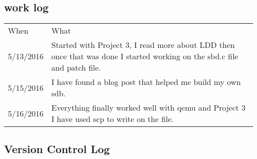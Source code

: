 \documentclass[letterpaper,10pt,draftclsnofoot,onecolumn]{IEEEtran}
\begin{document}
\subsection*{work log}
\begin{center}
\begin{tabular}{ |m{2cm}|m{5cm}| }
\hline
When & What \\
5/13/2016 & Started with Project 3, I read more about LDD then once that was done I started working on the sbd.c file and patch file.\\
5/15/2016 & I have found a blog post that helped me build my own sdb.\\
5/16/2016 & Everything finally worked well with qemu and Project 3 I have used scp to write on the file.\\
\hline
\end{tabular}
\end{center}

\subsection*{Version Control Log}

\end{document}
